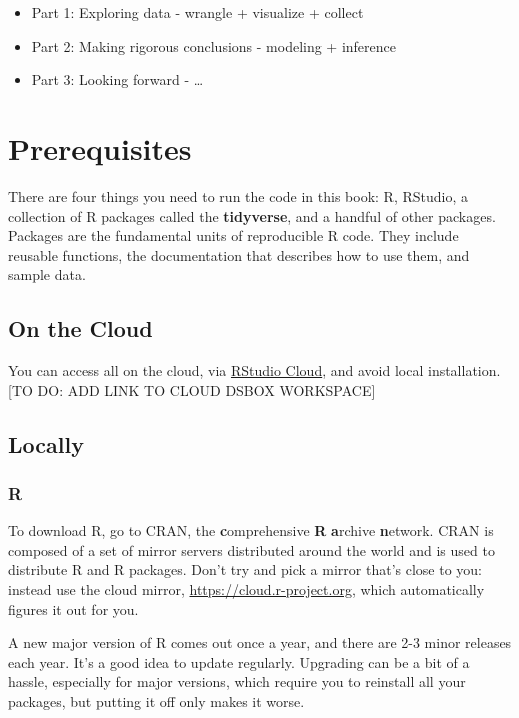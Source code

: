 \documentclass[]{book}
\providecommand{\tightlist}{%
  \setlength{\itemsep}{0pt}\setlength{\parskip}{0pt}}
\theoremstyle{definition}
\theoremstyle{definition}
\theoremstyle{definition}
\theoremstyle{remark}
\begin{document}
\begin{itemize}
\tightlist
\item
  Part 1: Exploring data - wrangle + visualize + collect
\item
  Part 2: Making rigorous conclusions - modeling + inference
\item
  Part 3: Looking forward - \ldots{}
\end{itemize}

\section{Prerequisites}\label{prerequisites}

There are four things you need to run the code in this book: R, RStudio,
a collection of R packages called the \textbf{tidyverse}, and a handful
of other packages. Packages are the fundamental units of reproducible R
code. They include reusable functions, the documentation that describes
how to use them, and sample data.

\subsection{On the Cloud}\label{on-the-cloud}

You can access all on the cloud, via
\href{http://rstudio.cloud/}{RStudio Cloud}, and avoid local
installation. {[}TO DO: ADD LINK TO CLOUD DSBOX WORKSPACE{]}

\subsection{Locally}\label{locally}

\subsubsection{R}\label{r}

To download R, go to CRAN, the \textbf{c}omprehensive \textbf{R}
\textbf{a}rchive \textbf{n}etwork. CRAN is composed of a set of mirror
servers distributed around the world and is used to distribute R and R
packages. Don't try and pick a mirror that's close to you: instead use
the cloud mirror, \url{https://cloud.r-project.org}, which automatically
figures it out for you.

A new major version of R comes out once a year, and there are 2-3 minor
releases each year. It's a good idea to update regularly. Upgrading can
be a bit of a hassle, especially for major versions, which require you
to reinstall all your packages, but putting it off only makes it worse.
\end{document}
